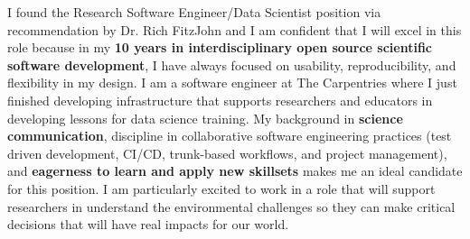 %
%
%



\vspace{2ex}

I found the Research Software Engineer/Data Scientist position via
recommendation by Dr. Rich FitzJohn and I am confident that I will excel in
this role because in my \textbf{10 years in interdisciplinary open source
scientific software development}, I have always focused on usability,
reproducibility, and flexibility in my design.
I am a software engineer at The Carpentries where I just finished developing
infrastructure that supports researchers and educators in developing lessons
for data science training. 
My background in \textbf{science communication}, discipline in collaborative
software engineering practices (test driven development, CI/CD, trunk-based
workflows, and project management), and \textbf{eagerness to learn and apply
new skillsets} makes me an ideal candidate for this position. 
I am particularly excited to work in a role that will support researchers in
understand the environmental challenges so they can make critical decisions
that will have real impacts for our world.

